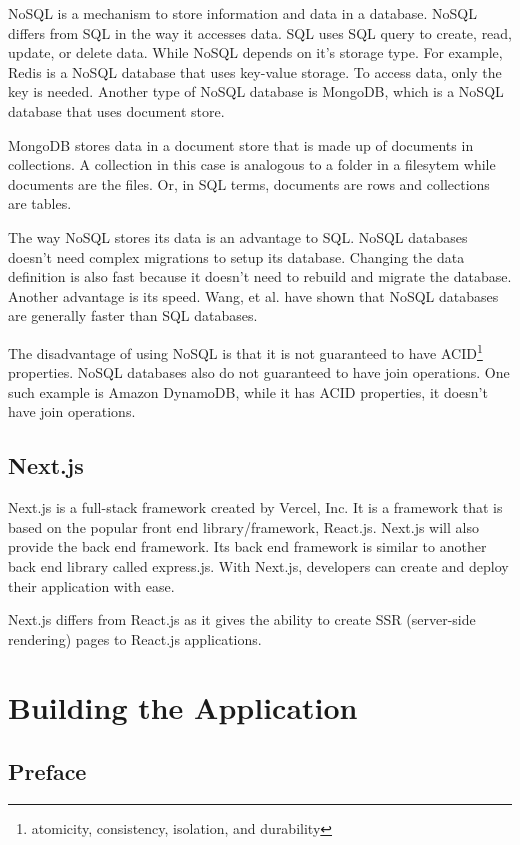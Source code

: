 \documentclass[conference]{IEEEtran}
\begin{document}
NoSQL is a mechanism to store information and data in a database. NoSQL differs from
SQL in the way it accesses data. SQL uses SQL query to create, read, update, or delete
data. While NoSQL depends on it's storage type. For example, Redis is a NoSQL database
that uses key-value storage. To access data, only the key is needed. Another type of
NoSQL database is MongoDB, which is a NoSQL database that uses document store.

MongoDB stores data in a document store that is made up of documents in collections.
A collection in this case is analogous to a folder in a filesytem while documents are
the files. Or, in SQL terms, documents are rows and collections are tables.

The way NoSQL stores its data is an advantage to SQL. NoSQL databases doesn't need
complex migrations to setup its database. Changing the data definition is also fast
because it doesn't need to rebuild and migrate the database. Another advantage is its
speed. Wang, et al. \cite{b2} have shown that NoSQL databases are generally faster
than SQL databases.

The disadvantage of using NoSQL is that it is not guaranteed to have ACID\footnote{
atomicity, consistency, isolation, and durability} properties. NoSQL databases also
do not guaranteed to have join operations. One such example is Amazon DynamoDB, while
it has ACID properties, it doesn't have join operations.

\subsection{Next.js}

Next.js is a full-stack framework created by Vercel, Inc. It is a framework that is
based on the popular front end library/framework, React.js. Next.js will also provide
the back end framework. Its back end framework is similar to another back end library
called express.js. With Next.js, developers can create and deploy their application
with ease.

Next.js differs from React.js as it gives the ability to create SSR (server-side
rendering) pages to React.js applications.

\section{Building the Application}

\subsection{Preface}
\end{document}
